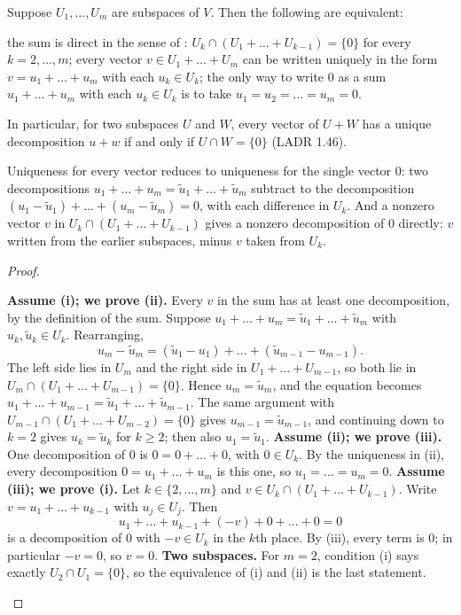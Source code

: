 \documentclass[10pt]{scrartcl}
\begin{document}
\begin{theorem*}
  Suppose $U_1,\dots,U_m$ are subspaces of $V$. Then the following are equivalent:
  \begin{enumerate}[(i)]
    \ii the sum is direct in the sense of : $U_k\cap(U_1+\dots+U_{k-1})=\{0\}$ for every $k=2,\dots,m$;
    \ii every vector $v\in U_1+\dots+U_m$ can be written uniquely in the form $v=u_1+\dots+u_m$ with each $u_k\in U_k$;
    \ii the only way to write $0$ as a sum $u_1+\dots+u_m$ with each $u_k\in U_k$ is to take $u_1=u_2=\dots=u_m=0$.
  \end{enumerate}
  In particular, for two subspaces $U$ and $W$, every vector of $U+W$ has a unique decomposition $u+w$ if and only if $U\cap W=\{0\}$ (LADR 1.46).
\end{theorem*}
\begin{ideabox}
  Uniqueness for every vector reduces to uniqueness for the single vector $0$: two decompositions $u_1+\dots+u_m=\tilde u_1+\dots+\tilde u_m$ subtract to the decomposition $(u_1-\tilde u_1)+\dots+(u_m-\tilde u_m)=0$, with each difference in $U_k$. And a nonzero vector $v$ in $U_k\cap(U_1+\dots+U_{k-1})$ gives a nonzero decomposition of $0$ directly: $v$ written from the earlier subspaces, minus $v$ taken from $U_k$.
\end{ideabox}
\begin{proof}
  \begin{steps}
    \ii \textbf{Assume (i); we prove (ii).} Every $v$ in the sum has at least one decomposition, by the definition of the sum. Suppose $u_1+\dots+u_m=\tilde u_1+\dots+\tilde u_m$ with $u_k,\tilde u_k\in U_k$. Rearranging,
    \[
      u_m-\tilde u_m=(\tilde u_1-u_1)+\dots+(\tilde u_{m-1}-u_{m-1}).
    \]
    The left side lies in $U_m$ and the right side in $U_1+\dots+U_{m-1}$, so both lie in $U_m\cap(U_1+\dots+U_{m-1})=\{0\}$. Hence $u_m=\tilde u_m$, and the equation becomes $u_1+\dots+u_{m-1}=\tilde u_1+\dots+\tilde u_{m-1}$. The same argument with $U_{m-1}\cap(U_1+\dots+U_{m-2})=\{0\}$ gives $u_{m-1}=\tilde u_{m-1}$, and continuing down to $k=2$ gives $u_k=\tilde u_k$ for $k\ge2$; then also $u_1=\tilde u_1$.
    \ii \textbf{Assume (ii); we prove (iii).} One decomposition of $0$ is $0=0+\dots+0$, with $0\in U_k$. By the uniqueness in (ii), every decomposition $0=u_1+\dots+u_m$ is this one, so $u_1=\dots=u_m=0$.
    \ii \textbf{Assume (iii); we prove (i).} Let $k\in\{2,\dots,m\}$ and $v\in U_k\cap(U_1+\dots+U_{k-1})$. Write $v=u_1+\dots+u_{k-1}$ with $u_j\in U_j$. Then
    \[
      u_1+\dots+u_{k-1}+(-v)+0+\dots+0=0
    \]
    is a decomposition of $0$ with $-v\in U_k$ in the $k$th place. By (iii), every term is $0$; in particular $-v=0$, so $v=0$.
    \ii \textbf{Two subspaces.} For $m=2$, condition (i) says exactly $U_2\cap U_1=\{0\}$, so the equivalence of (i) and (ii) is the last statement.
  \end{steps}
\end{proof}
\end{document}

